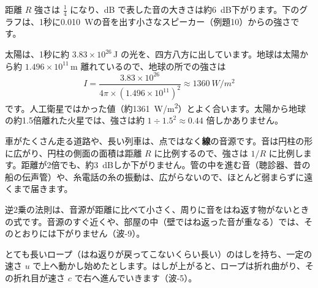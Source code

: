 \begin{phbaisuru}{距離 $R$}
強さは $\tfrac14$ になり、dB で表した音の大きさは約\qty{6}{dB}下がります。下のグラフは、1秒に\qty{0.010}{W}の音を出す小さなスピーカー（例題10）からの強さです。
\par\smallskip\noindent{}
\end{phbaisuru}

\begin{phmijika}[太陽の光の強さ]
太陽は、1秒に約 $3.83\times10^{26}$\,J の光を、四方八方に出しています。地球は太陽から約 $1.496\times10^{11}$\,m 離れているので、地球の所での強さは
\[I=\frac{3.83\times10^{26}}{4\pi\times(1.496\times10^{11})^2}\approx\qty{1360}{W/m^2}\]
です。人工衛星ではかった値（約\qty{1361}{W/m^2}）とよく合います。太陽から地球の約1.5倍離れた火星では、強さは約 $1\div1.5^2\approx0.44$ 倍しかありません。
\end{phmijika}

車がたくさん走る道路や、長い列車は、点ではなく\textbf{線}の音源です。音は円柱の形に広がり、円柱の側面の面積は距離 $R$ に比例するので、強さは $1/R$ に比例します。距離が2倍でも、約\qty{3}{dB}しか下がりません。管の中を進む音（聴診器、昔の船の伝声管）や、糸電話の糸の振動は、広がらないので、ほとんど弱まらずに遠くまで届きます。

\begin{seikaku}
逆2乗の法則は、音源が距離に比べて小さく、周りに音をはね返す物がないときの式です。音源のすぐ近くや、部屋の中（壁ではね返った音が重なる）では、そのとおりには下がりません（波-9）。
\end{seikaku}


\label{ph:波-7:sec3}
とても長いロープ（はね返りが戻ってこないくらい長い）のはしを持ち、一定の速さ $u$ で上へ動かし始めたとします。はしが上がると、ロープは折れ曲がり、その折れ目が速さ $c$ で右へ進んでいきます（波-5）。

